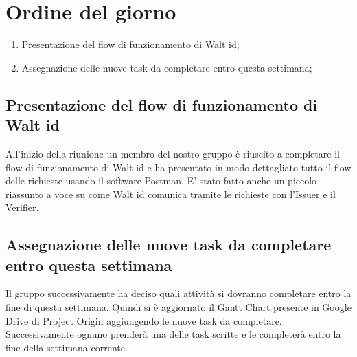 \section{Ordine del giorno}
\begin{enumerate}
\item Presentazione del flow di funzionamento di Walt id;
\item Assegnazione delle nuove task da completare entro questa settimana;
\end{enumerate}
\subsection{Presentazione del flow di funzionamento di Walt id}
All'inizio della riunione un membro del nostro gruppo è riuscito a completare il flow di funzionamento di Walt id e ha presentato in modo dettagliato tutto il flow delle richieste usando il software Postman\glo. E' stato fatto anche un piccolo riassunto a voce su come Walt id comunica tramite le richieste con l'Issuer e il Verifier.
\subsection{Assegnazione delle nuove task da completare entro questa settimana}
Il gruppo successivamente ha deciso quali attività si dovranno completare entro la fine di questa settimana. Quindi si è aggiornato il Gantt Chart presente in Google Drive di Project Origin aggiungendo le nuove task da completare.\\
Successivamente ognuno prenderà una delle task scritte e le completerà entro la fine della settimana corrente.